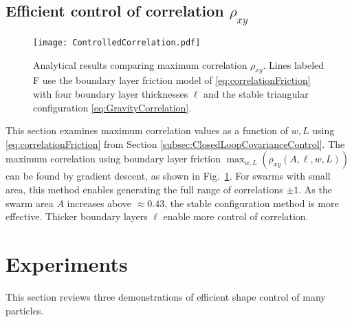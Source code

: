 \subsection{Efficient control of correlation  $\rho_{xy}$}\label{subsec:efficientCorrelation}
\begin{figure}[htb]
\begin{center}
	\texttt{[image: ControlledCorrelation.pdf]}
\end{center}
\vspace{-1em}
\caption{\label{fig:ControlledCorrelation}
Analytical results comparing maximum correlation $\rho_{xy}$. Lines labeled \textsf{F} use the boundary layer friction model of \eqref{eq:correlationFriction} with four boundary layer thicknesses $\ell$ and the stable triangular configuration \eqref{eq:GravityCorrelation}.
}\end{figure}

This section examines maximum correlation values as a function of  $w,L$ using \eqref{eq:correlationFriction}
from Section  \ref{subsec:ClosedLoopCovarianceControl}. 
The maximum correlation using boundary layer friction $\displaystyle  \max_{w,L} \left( \rho_{xy}(A,\ell,w,L) \right)$ can be found by gradient descent, as shown in Fig.~\ref{fig:ControlledCorrelation}. 
For swarms with small area, this method enables generating the full range of correlations $\pm 1$. %
  As  the swarm area $A$ increases above $\approx 0.43$, the stable configuration method is more effective.
Thicker boundary layers $\ell$ enable more control of correlation.





\section{Experiments}\label{sec:Experiments}
This section reviews three demonstrations of efficient shape control of many particles.
